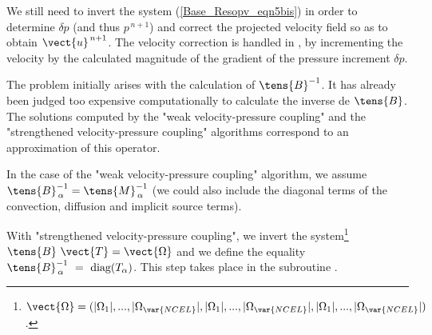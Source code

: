 We still need to invert the system (\ref{Base_Resopv_eqn5bis}) in order to determine $\delta p$ (and thus $p^{\,n+1}$) and correct the projected velocity field so as to obtain $\vect{u}^{\,n+1}$. The velocity correction is handled in , by incrementing the velocity by the calculated magnitude of the gradient of the pressure increment $\delta p$.

The problem initially arises with the calculation of $\tens{B}^{-1}$. It has already been judged too expensive computationally to calculate the inverse de $\tens{B}$. The solutions computed by the "weak velocity-pressure coupling" and the "strengthened velocity-pressure coupling" algorithms correspond to an approximation of this operator.

In the case of the "weak velocity-pressure coupling" algorithm, we assume $\tens{B}_{\,\alpha}^{-1} = \tens{M}_{\,\alpha}^{-1}$ (we could also include the diagonal terms of the convection, diffusion and implicit source terms).

With "strengthened velocity-pressure coupling", we invert the system\footnote{$\vect{\Omega} = (|\Omega_1|,...,|\Omega_{\var{NCEL}}|,|\Omega_1|,...,|\Omega_{\var{NCEL}}|,|\Omega_1|,...,|\Omega_{\var{NCEL}}|)$.} $\tens{B}\ \vect{T} = \vect{\Omega} $ and we define the equality $\tens{B}_{\,\alpha}^{-1}~=~\text{diag}(T_\alpha) $. This step takes place in the subroutine .


